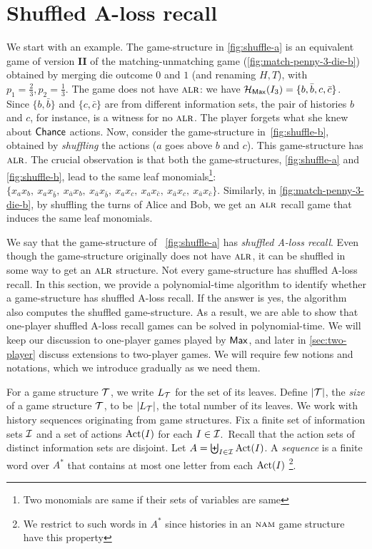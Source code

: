 
\section{Shuffled A-loss recall}
\label{sec:shuffled-loss-recall}



We start with an example. The game-structure in \cref{fig:shuffle-a}
is an equivalent game of version \textbf{II} of the matching-unmatching
game (\cref{fig:match-penny-3-die-b}) obtained by merging die outcome $0$ and $1$ (and renaming $H, T$), with $p_1 = \frac{2}{3}, p_2 = \frac{1}{3}$. The game
does not have $\textsc{alr}$: we have
$\mathcal{H}_{\mathsf{Max}}(I_3) = \{b, \bar{b}, c, \bar{c}\}$. Since
$\{b, \bar{b}\}$ and $\{c, \bar{c}\}$ are from different information
sets, the pair of histories $b$ and $c$, for instance, is a witness
for no $\textsc{alr}$. The player forgets what she knew about $\mathsf{Chance}$ actions. Now,
consider the game-structure in~\cref{fig:shuffle-b}, obtained by
\emph{shuffling} the actions ($a$ goes above $b$ and $c$). This
game-structure has $\textsc{alr}$. The crucial observation is that both
the game-structures, \cref{fig:shuffle-a} and \cref{fig:shuffle-b},
lead to the same leaf monomials\footnote{Two monomials are same if their sets of variables are same}:
$\{x_ax_b,~x_ax_{\bar{b}},~x_{\bar{a}}x_b,~x_{\bar{a}}x_{\bar{b}},~x_ax_c,~
x_ax_{\bar{c}},~x_{\bar{a}}x_c,~x_{\bar{a}}x_{\bar{c}} \}$. Similarly,
in \cref{fig:match-penny-3-die-b}, by shuffling the turns of Alice and
Bob, we get an $\textsc{alr}$ recall game that induces the same leaf
monomials. 

We say that the game-structure of ~\cref{fig:shuffle-a} has
\emph{shuffled A-loss recall}. Even though the game-structure
originally does not have $\textsc{alr}$, it can be shuffled in some way
to get an $\textsc{alr}$ structure.  Not every game-structure has shuffled
A-loss recall. In this section, we provide a polynomial-time algorithm
to identify whether a game-structure has shuffled A-loss recall. If
the answer is yes, the algorithm also computes the shuffled
game-structure. As a result, we are able to show that one-player
shuffled A-loss recall games can be solved in
polynomial-time. 
We will keep our discussion to one-player games played by $\mathsf{Max}$, and
later in \cref{sec:two-player} discuss extensions to two-player
games. 
We will require few notions and notations, which we introduce
gradually as we need them.


For a game structure $\mathcal{T}$, we write $L_{\mathcal{T}}$ for the set of its
leaves. Define $|\mathcal{T}|$, the \emph{size} of a game structure $\mathcal{T}$, to be
$|L_{\mathcal{T}}|$, the total number of its leaves. We work with history sequences originating from game structures.
Fix a finite set of information
sets $\mathcal{I}$ and a set of actions $\operatorname{Act}(I)$ for each $I \in \mathcal{I}$.~Recall that the action sets of distinct information sets are disjoint. 
Let $A = \biguplus_{I \in \mathcal{I}} \operatorname{Act}(I)$. A \emph{sequence} is a finite word over
$A^*$ that contains at most one letter from each $\operatorname{Act}(I)$ \footnote{
 We restrict to such words in $A^*$ since histories in an $\textsc{nam}$ game structure have this property}.

